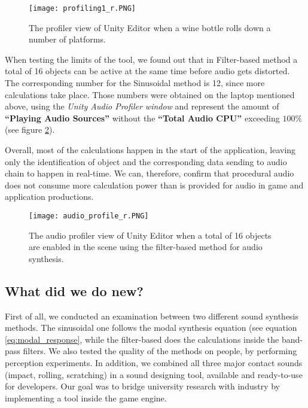 \begin{figure}[H]
  \centering
    \texttt{[image: profiling1\_r.PNG]}
      \caption{The profiler view of Unity\textsuperscript{\textregistered} Editor when a wine bottle rolls down a number of platforms.}
      \label{fig:profile}
\end{figure} 

When testing the limits of the tool, we found out that in Filter-based method a total of 16 objects can be active at the same time before audio gets distorted. The corresponding number for the Sinusoidal method is 12, since more calculations take place. Those numbers were obtained on the laptop mentioned above, using the \textit{Unity\textsuperscript{\textregistered} Audio Profiler window} and represent the amount of \textbf{``Playing Audio Sources''} without the \textbf{``Total Audio CPU''} exceeding $100\%$ (see figure \ref{fig:audio_profile}).

Overall, most of the calculations happen in the start of the application, leaving only the identification of object and the corresponding data sending to audio chain to happen in real-time. We can, therefore, confirm that procedural audio does not consume more calculation power than is provided for audio in game and application productions.   

\begin{figure}[H]
  \centering
    \texttt{[image: audio\_profile\_r.PNG]}
      \caption{The audio profiler view of Unity\textsuperscript{\textregistered} Editor when a total of 16 objects are enabled in the scene using the filter-based method for audio synthesis.}
      \label{fig:audio_profile}
\end{figure}

\subsection{What did we do new?}
First of all, we conducted an examination between two different sound synthesis methods. The sinusoidal one follows the modal synthesis equation (see equation \ref{eq:modal_response}, while the filter-based does the calculations inside the band-pass filters. We also tested the quality of the methods on people, by performing perception experiments. In addition, we combined all three major contact sounds (impact, rolling, scratching) in a sound designing tool, available and ready-to-use for developers. Our goal was to bridge university research with industry by implementing a tool inside the game engine.

